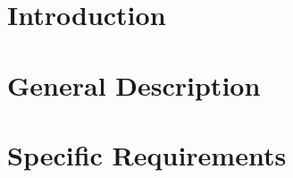 \maketitle
\clearpage
\tableofcontents

\clearpage
\section{Introduction} \label{Intro}


\clearpage
\section{General Description} \label{Description}


\clearpage
\section{Specific Requirements} \label {Requirements}


